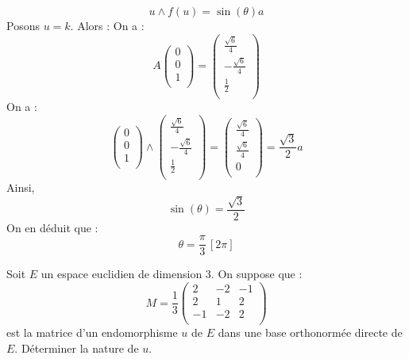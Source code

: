 \documentclass[a4paper,twoside,french,11pt]{VcCours}
\begin{document}
\begin{enumerate}
$$ u \wedge f(u) = \sin(\theta) a$$
Posons $u=k$. Alors :
On a :
$$ A \begin{pmatrix}
0 \\
0 \\
1 \\
\end{pmatrix} = \begin{pmatrix}
 \tfrac{\sqrt{6}}{4} \\
 -\tfrac{\sqrt{6}}{4} \\
 \tfrac{1}{2} \\
\end{pmatrix}$$
On a :
$$ 
\begin{pmatrix}
0 \\
0 \\
1 \\
\end{pmatrix} \wedge \begin{pmatrix}
 \tfrac{\sqrt{6}}{4} \\
 -\tfrac{\sqrt{6}}{4} \\
 \tfrac{1}{2} \\
\end{pmatrix} = \begin{pmatrix}
\tfrac{\sqrt{6}}{4}\\
\tfrac{\sqrt{6}}{4} \\
0 \\
\end{pmatrix} = \dfrac{\sqrt{3}}{2} a$$
Ainsi,
$$\sin(\theta)=\frac{\sqrt{3}}{2}$$
On en déduit que :
$$\theta=\dfrac{\pi}{3} \, [2\pi]$$
\end{enumerate}


\begin{Exercice}{} Soit $E$ un espace euclidien de dimension $3$. On suppose que :
$$ M = \dfrac{1}{3} \begin{pmatrix}
2 & -2 & -1 \\
2 & 1 & 2 \\
-1 & -2 & 2 \\
\end{pmatrix}$$
est la matrice d'un endomorphisme $u$ de $E$ dans une base orthonormée directe de $E$. Déterminer la nature de $u$.
\end{Exercice}
\end{document}
